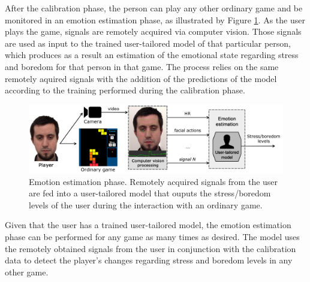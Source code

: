 After the calibration phase, the person can play any other ordinary game and be monitored in an emotion estimation phase, as illustrated by Figure \ref{fig:user-tailored-use}. As the user plays the game, signals are remotely acquired via computer vision. Those signals are used as input to the trained user-tailored model of that particular person, which produces as a result an estimation of the emotional state regarding stress and boredom for that person in that game. The process relies on the same remotely aquired signals with the addition of the predictions of the model according to the training performed during the calibration phase.

\begin{figure}[h]
    \centering
    \includegraphics[width=\textwidth]{figures/user-tailored-use.png}
    \caption{Emotion estimation phase. Remotely acquired signals from the user are fed into a user-tailored model that ouputs the stress/boredom levels of the user during the interaction with an ordinary game.}
    \label{fig:user-tailored-use}
\end{figure}

Given that the user has a trained user-tailored model, the emotion estimation phase can be performed for any game as many times as desired. The model uses the remotely obtained signals from the user in conjunction with the calibration data to detect the player's changes regarding stress and boredom levels in any other game.


